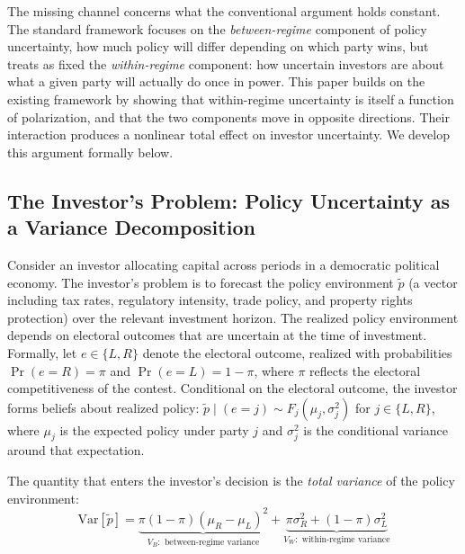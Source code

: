 \documentclass[12pt]{article}
\begin{document}
The missing channel concerns what the conventional argument holds constant.
The standard framework focuses on the \textit{between-regime} component of
policy uncertainty, how much policy will differ depending on which party
wins, but treats as fixed the \textit{within-regime} component: how uncertain
investors are about what a given party will actually do once in power. This
paper builds on the existing framework by showing that within-regime
uncertainty is itself a function of polarization, and that the two
components move in opposite directions. Their interaction produces a
nonlinear total effect on investor uncertainty. We develop this argument
formally below.

\subsection{The Investor's Problem: Policy Uncertainty as a Variance
Decomposition}

Consider an investor allocating capital across periods in a democratic
political economy. The investor's problem is to forecast the policy
environment $\tilde{p}$ (a vector including tax rates, regulatory
intensity, trade policy, and property rights protection) over the relevant
investment horizon. The realized policy environment depends on electoral
outcomes that are uncertain at the time of investment. Formally, let $e \in
\{L, R\}$ denote the electoral outcome, realized with probabilities
$\Pr(e = R) = \pi$ and $\Pr(e = L) = 1 - \pi$, where $\pi$ reflects the
electoral competitiveness of the contest. Conditional on the electoral
outcome, the investor forms beliefs about realized policy: $\tilde{p} \mid
(e = j) \sim F_j(\mu_j, \sigma_j^2)$ for $j \in \{L, R\}$, where $\mu_j$
is the expected policy under party $j$ and $\sigma_j^2$ is the conditional
variance around that expectation.

The quantity that enters the investor's decision is the \textit{total
variance} of the policy environment:
\begin{equation}
\label{eq:decomp}
\textstyle\text{Var}[\tilde{p}] = \underbrace{\pi(1-\pi)(\mu_R - \mu_L)^2}_{V_B:
\text{ between-regime variance}} + \underbrace{\pi\sigma_R^2 +
(1-\pi)\sigma_L^2}_{V_W: \text{ within-regime variance}}
\end{equation}
\end{document}
